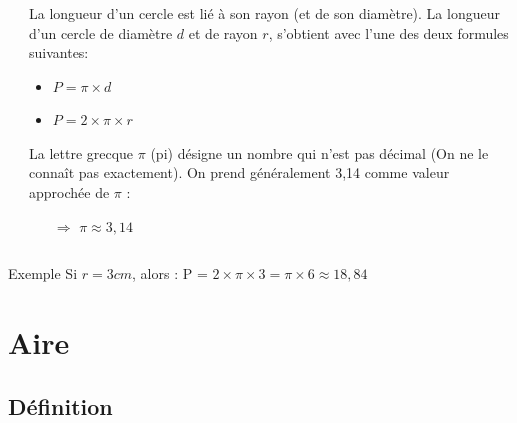 \documentclass[xcolor=table]{beamer}
\begin{document}
\begin{frame}
	\frametitle{}  
	\framesubtitle{}	
	
	\begin{columns}[onlytextwidth]
		\begin{column}{0.3\textwidth}
			
		\end{column}
		\begin{column}{0.7\textwidth}
			La longueur d'un cercle est lié à son rayon (et de son diamètre).
			La longueur d'un cercle de diamètre $d$ et de rayon $r$, s'obtient avec l'une des deux formules suivantes:
			
			\begin{itemize}
				\item $P = \pi \times d$
				\item $P = 2 \times \pi \times r$
			\end{itemize}
			
			La lettre grecque $\pi$ (pi) désigne un nombre qui n'est pas décimal (On ne le connaît pas exactement).
			On prend généralement 3,14 comme valeur approchée de $\pi$ :
			\begin{itemize}
				\item[$\Rightarrow$] $ \pi \approx 3,14$
			\end{itemize}
		\end{column}
	\end{columns}
	
	\begin{block}{Exemple}
		Si $r = 3 cm$, alors : P = $2 \times \pi \times 3 = \pi \times 6 \approx 18,84$
	\end{block}
\end{frame}
	
\section{Aire}

\subsection{Définition}
\end{document}
